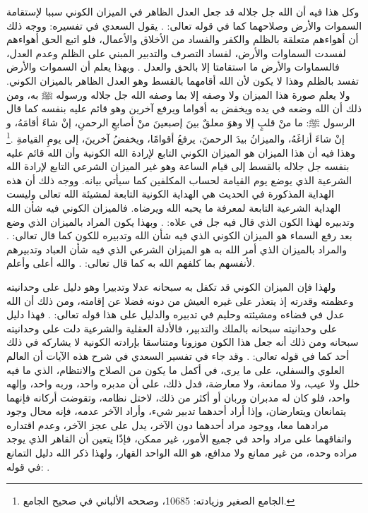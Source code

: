 وكل هذا فيه أن الله جل جلاله قد جعل العدل الظاهر في الميزان الكوني سببا لإستقامة السموات والأرض وصلاحهما كما في قوله تعالى:
\quranayah*[23][71]{\footnotesize \surahname*[23]}. يقول السعدي في تفسيره:
ووجه ذلك أن أهواءهم متعلقة بالظلم والكفر والفساد من الأخلاق والأعمال، فلو اتبع الحق أهواءهم لفسدت السماوات والأرض، لفساد التصرف والتدبير المبني على الظلم وعدم العدل، فالسماوات والأرض ما استقامتا إلا بالحق والعدل \href{https://shamela.ws/book/42/1255#p12}{\faExternalLink} \cite{tafsir_Saadi}. وبهذا يعلم أن السموات والأرض تفسد بالظلم وهذا لا يكون لأن الله أقامهما بالقسط وهو العدل الظاهر بالميزان الكوني. ولا يعلم صورة هذا الميزان ولا وصفه إلا بما وصفه الله جل جلاله ورسوله ﷺ به، ومن ذلك أن الله وضعه في يده ويخفض به أقواما ويرفع آخرين وهو قائم عليه بنفسه كما قال الرسول ﷺ: ما منْ قلبٍ إلا وهوَ معلقٌ بينَ إصبعينَ منْ أصابعِ الرحمنِ، إنْ شاءَ أقامَهُ، و إنْ شاءَ أزاغَهُ، والميزانُ بيدَ الرحمنَ، يرفعُ أقوامًا، ويخفضُ آخرينَ، إلى يومِ القيامةِ \href{https://shamela.ws/book/21659/10685#p1}{\faExternalLink} \cite{jamaaSagheer}.\footnote{الجامع الصغير وزيادته: 10685، وصححه الألباني في صحيح الجامع.} وهذا فيه أن هذا الميزان هو الميزان الكوني التابع لإرادة الله الكونية وأن الله قائم عليه بنفسه جل جلاله بالقسط إلى قيام الساعة وهو غير الميزان الشرعي التابع لإرادة الله الشرعية الذي يوضع يوم القيامة لحساب المكلفين كما سيأتي بيانه. ووجه ذلك أن هذه الهداية المذكورة في الحديث هي الهداية الكونية التابعة لمشيئة الله تعالى وليست الهداية الشرعية التابعة لمعرفة ما يحبه الله ويرضاه. فالميزان الكوني فيه شأن الله وتدبيره لهذا الكون الذي قال فيه جل في علاه: \quranayah*[55][29]{\footnotesize \surahname*[55]}. وبهذا يكون المراد بالميزان الذي وضع بعد رفع السماء هو الميزان الكوني الذي فيه شأن الله وتدبيره للكون كما قال تعالى: 
\quranayah*[55][7]{\footnotesize \surahname*[55]}. والمراد بالميزان الذي أمر الله به هو الميزان الشرعي الذي فيه شأن العباد وتدبيرهم لأنفسهم بما كلفهم الله به كما قال تعالى:
\quranayah*[55][8-9]{\footnotesize \surahname*[55]}. والله أعلى وأعلم.

ولهذا فإن الميزان الكوني قد تكفل به سبحانه عدلا وتدبيرا وهو دليل على وحدانيته وعظمته وقدرته إذ يتعذر على غيره العيش من دونه فضلا عن إقامته، ومن ذلك أن الله عدل في قضاءه ومشيئته وحليم في تدبيره والدليل على هذا قوله تعالى:
\quranayah*[35][41]{\footnotesize \surahname*[35]}. فهذا دليل على وحدانيته سبحانه بالملك والتدبير، فالأدلة العقلية والشرعية دلت على وحدانيته سبحانه ومن ذلك أنه جعل هذا الكون موزونا ومتناسقا بإرادته الكونية لا يشاركه في ذلك أحد كما في قوله تعالى:
\quranayah*[21][22]{\footnotesize \surahname*[21]}. وقد جاء في تفسير السعدي في شرح هذه الآيات أن العالم العلوي والسفلي، على ما يرى، في أكمل ما يكون من الصلاح والانتظام، الذي ما فيه خلل ولا عيب، ولا ممانعة، ولا معارضة، فدل ذلك، على أن مدبره واحد، وربه واحد، وإلهه واحد، فلو كان له مدبران وربان أو أكثر من ذلك، لاختل نظامه، وتقوضت أركانه فإنهما يتمانعان ويتعارضان، وإذا أراد أحدهما تدبير شيء، وأراد الآخر عدمه، فإنه محال وجود مرادهما معا، ووجود مراد أحدهما دون الآخر، يدل على عجز الآخر، وعدم اقتداره واتفاقهما على مراد واحد في جميع الأمور، غير ممكن، فإذًا يتعين أن القاهر الذي يوجد مراده وحده، من غير ممانع ولا مدافع، هو الله الواحد القهار، ولهذا ذكر الله دليل التمانع في قوله:
\quranayah*[23][91]{\footnotesize \surahname*[23]} \href{https://shamela.ws/book/42/1173#p4}{\faExternalLink} \cite{tafsir_Saadi}.

